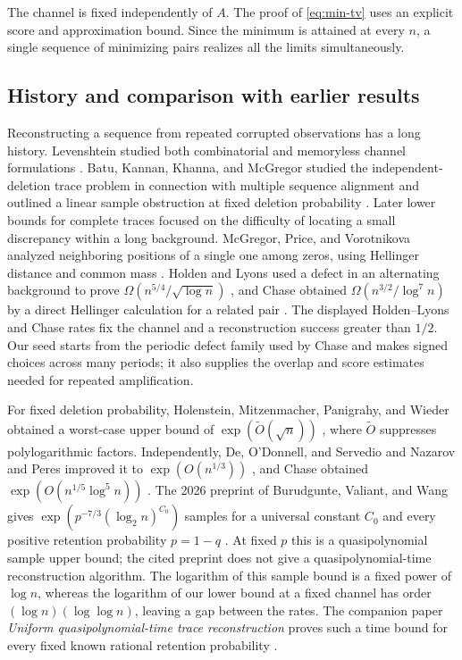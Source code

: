 The channel is fixed independently of $A$.  The proof of \eqref{eq:min-tv} uses an explicit score and approximation bound.  Since the minimum is attained at every $n$, a single sequence of minimizing pairs realizes all the limits simultaneously.

\subsection{History and comparison with earlier results}

Reconstructing a sequence from repeated corrupted observations has a long history.  Levenshtein studied both combinatorial and memoryless channel formulations \citep{Levenshtein2001}.  Batu, Kannan, Khanna, and McGregor studied the independent-deletion trace problem in connection with multiple sequence alignment and outlined a linear sample obstruction at fixed deletion probability \citep[Section 4.2]{Batu2004}.  Later lower bounds for complete traces focused on the difficulty of locating a small discrepancy within a long background.  McGregor, Price, and Vorotnikova analyzed neighboring positions of a single one among zeros, using Hellinger distance and common mass \citep{MPV2014}.  Holden and Lyons used a defect in an alternating background to prove $\Omega(n^{5/4}/\sqrt{\log n})$ \citep{HoldenLyons2020,HoldenLyonsErratum2022}, and Chase obtained $\Omega(n^{3/2}/\log^7 n)$ by a direct Hellinger calculation for a related pair \citep{Chase2021Lower}.  The displayed Holden--Lyons and Chase rates fix the channel and a reconstruction success greater than $1/2$.  Our seed starts from the periodic defect family used by Chase and makes signed choices across many periods; it also supplies the overlap and score estimates needed for repeated amplification.

For fixed deletion probability, Holenstein, Mitzenmacher, Panigrahy, and Wieder obtained a worst-case upper bound of $\exp(\widetilde O(\sqrt n))$ \citep{HMPW2008}, where $\widetilde O$ suppresses polylogarithmic factors.  Independently, De, O'Donnell, and Servedio and Nazarov and Peres improved it to $\exp(O(n^{1/3}))$ \citep{DOS2017,NP2017}, and Chase obtained $\exp(O(n^{1/5}\log^5 n))$ \citep{Chase2021Upper}.  The 2026 preprint of Burudgunte, Valiant, and Wang gives
$\exp(p^{-7/3}(\log_2 n)^{C_0})$ samples for a universal constant $C_0$ and every positive retention probability $p=1-q$ \citep{BVW2026}.  At fixed $p$ this is a quasipolynomial sample upper bound; the cited preprint does not give a quasipolynomial-time reconstruction algorithm.  The logarithm of this sample bound is a fixed power of $\log n$, whereas the logarithm of our lower bound at a fixed channel has order $(\log n)(\log\log n)$, leaving a gap between the rates.  The companion paper \emph{Uniform quasipolynomial-time trace reconstruction} proves such a time bound for every fixed known rational retention probability \citep{OAI:Uniform-quasipolynomial-time-trace-reconstruction-October-5-2026}.

